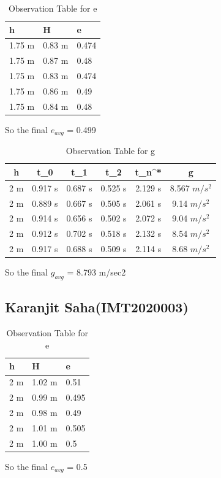 \documentclass[11pt]{scrartcl} %
\begin{document}
\begin{table}[h] %
	\centering %
	\begin{tabular}{l l l}
		\toprule
		\textbf{h} & \textbf{H} & \textbf{e} \\
		\midrule
		1.75 m & 0.83 m & 0.474\\
        1.75 m & 0.87 m  & 0.48\\
        1.75 m & 0.83 m  & 0.474\\
        1.75 m & 0.86 m & 0.49 \\
        1.75 m & 0.84 m & 0.48 \\
		\bottomrule
	\end{tabular}
	\caption{Observation Table for e}
\end{table}
So the final $e_{avg}$ = 0.499

\begin{table}[h]
\centering
\begin{tabular}{||c c c c c c||} 
\toprule
 \hline
 h & t_0 & t_1 & t_2 & t_n^* & g \\ [0.5ex] 
 \midrule
 \hline\hline
 2 m & 0.917 s & 0.687 s  & 0.525 s & 2.129 s & 8.567 $m/s^2$  \\ 
 \hline
 2 m & 0.889 s & 0.667 s & 0.505 s & 2.061 s & 9.14 $m/s^2$  \\
 \hline 
 2 m & 0.914 s & 0.656 s & 0.502 s & 2.072 s  & 9.04 $m/s^2$   \\
 \hline
 2 m & 0.912 s & 0.702 s & 0.518 s & 2.132 s  & 8.54 $m/s^2$   \\
 \hline
 2 m & 0.917 s & 0.688 s & 0.509 s & 2.114 s  & 8.68 $m/s^2$  \\ 
 [1ex]
 \bottomrule
 \hline
\end{tabular}
\caption{Observation Table for g}
\end{table}
So the final $g_{avg}$ = 8.793 m/sec2
\newpage
\subsection{Karanjit Saha(IMT2020003)}

\begin{table}[h] %
	\centering %
	\begin{tabular}{l l l}
		\toprule
		\textbf{h} & \textbf{H} & \textbf{e} \\
		\midrule
		2 m & 1.02 m & 0.51\\
		2 m & 0.99 m  & 0.495\\
		2 m & 0.98 m  & 0.49\\
		2 m & 1.01 m & 0.505 \\
		2 m & 1.00 m & 0.5 \\
		\bottomrule
	\end{tabular}
	\caption{Observation Table for e}
\end{table}
So the final $e_{avg}$ = 0.5
\end{document}
